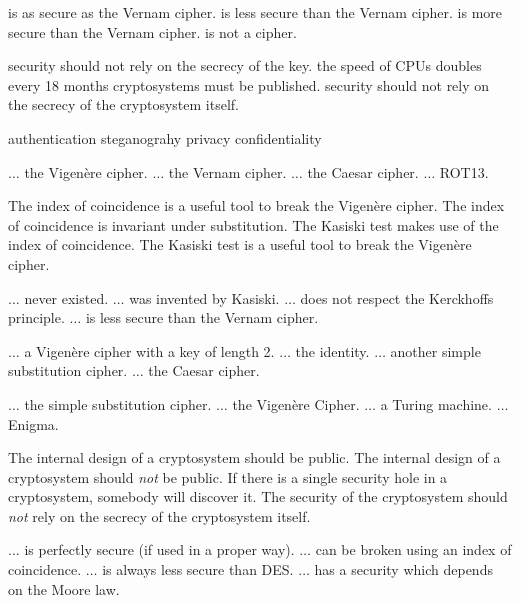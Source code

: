 %
{is as secure as the Vernam cipher.}%
{is less secure than the Vernam cipher.}%
{is more secure than the Vernam cipher.}%
{is not a cipher.}%

%
{security should not rely on the secrecy of the key.}%
{the speed of CPUs doubles every 18 months}%
{cryptosystems must be published.}%
{security should not rely on the secrecy of the cryptosystem itself.}%


{authentication}%
{steganograhy}%
{privacy}%
{confidentiality}%

{$ \ldots $ the Vigen\`ere cipher.}%
{$ \ldots $ the Vernam cipher.}%
{$ \ldots $ the Caesar cipher.}%
{$ \ldots $ ROT13.}%
 
%
{The index of coincidence is a useful tool to break the Vigen\`ere cipher.}%
{The index of coincidence is invariant under substitution.}%
{The Kasiski test makes use of the index of coincidence.}%
{The Kasiski test is a useful tool to break the Vigen\`ere cipher.}%

%
{$ \ldots $ never existed.}%
{$ \ldots $ was invented by Kasiski.}%
{$ \ldots $ does not respect the Kerckhoffs principle.}%
{$ \ldots $ is less secure than the Vernam cipher.}%
 
 
%
{$ \ldots $  a Vigen\`ere cipher with a key of length 2.}%
{$ \ldots $ the identity.}%
{$ \ldots $ another simple substitution cipher.}%
{$ \ldots $ the Caesar cipher.}%


%
{$ \dots $ the simple substitution cipher.}%
{$ \dots $ the Vigen\`ere Cipher.}%
{$ \dots $ a Turing machine.}%
{$ \dots $ Enigma.}%

%
{The internal design of a cryptosystem should be public.}%
{The internal design of a cryptosystem should \emph{not} be public.}%
{If there is a single security hole in a cryptosystem, somebody will discover it.}%
{The security of the cryptosystem should \emph{not} rely on the secrecy of the cryptosystem itself.}%

%
{$ \dots $ is perfectly secure (if used in a proper way).}%
{$ \dots $ can be broken using an index of coincidence.}%
{$ \dots $ is always less secure than DES.}%
{$ \dots $ has a security which depends on the Moore law.}%

